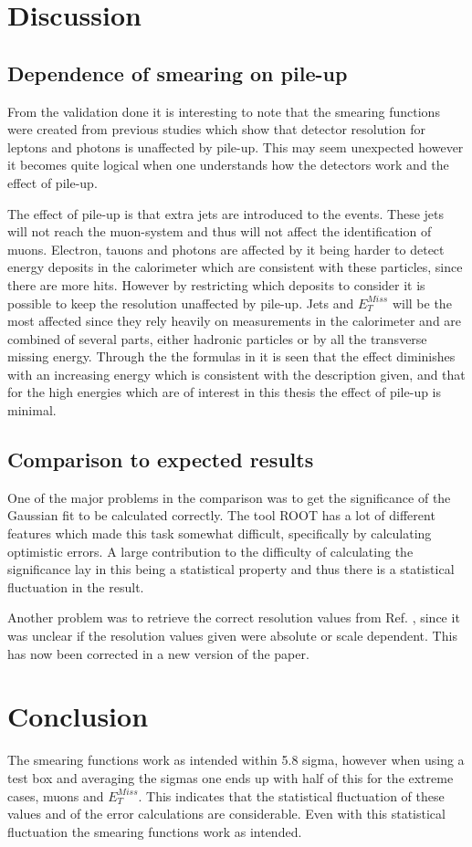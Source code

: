 \newpage
\section{Discussion}\label{chap:vali:sec:dis}
\subsection{Dependence of smearing on pile-up}\label{chap:vali:sec:dis:subsec:smearindep}
From the validation done it is interesting to note that the smearing functions were created from previous studies \citep{Electronperf:2011, ATLAS:LOI2} which show that detector resolution for leptons and photons is unaffected by pile-up. This may seem unexpected however it becomes quite logical when one understands how the detectors work and the effect of pile-up.

The effect of pile-up is that extra jets are introduced to the events. These jets will not reach the muon-system and thus will not affect the identification of muons. Electron, tauons and photons are affected by it being harder to detect energy deposits in the calorimeter which are consistent with these particles, since there are more hits. However by restricting which deposits to consider it is possible to keep the resolution unaffected by pile-up. Jets and $E_T^{Miss}$ will be the most affected since they rely heavily on measurements in the calorimeter and are combined of several parts, either hadronic particles or by all the transverse missing energy. Through the the formulas in  it is seen that the effect diminishes with an increasing energy which is consistent with the description given, and that for the high energies which are of interest in this thesis the effect of pile-up is minimal. 

\subsection{Comparison to expected results}
One of the major problems in the comparison was to get the significance of the Gaussian fit to be calculated correctly. The tool ROOT has a lot of different features which made this task somewhat difficult, specifically by calculating optimistic errors. A large contribution to the difficulty of calculating the significance lay in this being a statistical property and thus there is a statistical fluctuation in the result. 

Another problem was to retrieve the correct resolution values from Ref. \citep{ATL-PHYS-PUB-2013-004}, since it was unclear if the resolution values given were absolute or scale dependent. This has now been corrected in a new version of the paper.

\section{Conclusion}
The smearing functions work as intended within 5.8 sigma, however when using a test box and averaging the sigmas one ends up with half of this for the extreme cases, muons and $E_T^{Miss}$. This indicates that the statistical fluctuation of these values and of the error calculations are considerable. Even with this statistical fluctuation the smearing functions work as intended.